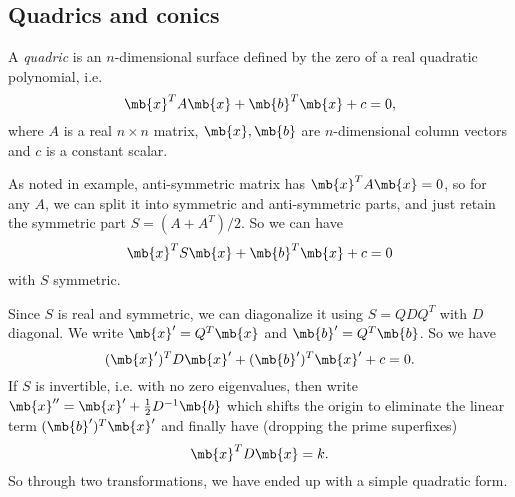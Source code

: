 \documentclass[a4paper]{article}
\begin{document}
\subsection{Quadrics and conics}

\begin{defi}[Quadric]
  A \emph{quadric} is an $n$-dimensional surface defined by the zero of a real quadratic polynomial, i.e.
\[
\mb{x}^T A\mb{x} + \mb{b}^T\mb{x} + c = 0,
\]
where $A$ is a real $n\times n$ matrix, $\mb{x}, \mb{b}$ are $n$-dimensional column vectors and $c$ is a constant scalar.
\end{defi}

As noted in example, anti-symmetric matrix has $\mb{x}^TA\mb{x} = 0$, so for any $A$, we can split it into symmetric and anti-symmetric parts, and just retain the symmetric part $S = (A + A^T)/2$. So we can have
\[
\mb{x}^T S\mb{x} + \mb{b}^T\mb{x} + c = 0
\]
with $S$ symmetric.

Since $S$ is real and symmetric, we can diagonalize it using $S = QDQ^T$ with $D$ diagonal. We write $\mb{x}' = Q^T \mb{x}$ and $\mb{b}' = Q^T \mb{b}$. So we have
\[
(\mb{x}')^TD\mb{x}' + (\mb{b}')^T \mb{x}' + c = 0.
\]
If $S$ is invertible, i.e. with no zero eigenvalues, then write $\mb{x}'' = \mb{x}' + \frac{1}{2}D^{-1}\mb{b}$ which shifts the origin to eliminate the linear term $(\mb{b}')^T\mb{x}'$ and finally have (dropping the prime superfixes)
\[
\mb{x}^TD\mb{x} = k.
\]
So through two transformations, we have ended up with a simple quadratic form.
\end{document}
